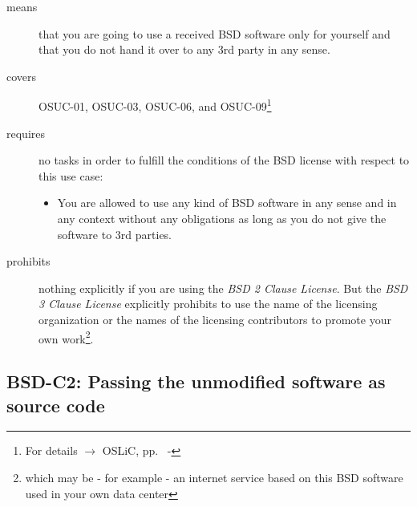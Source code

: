 \begin{description}
\item[means] that you are going to use a received BSD software only for yourself
and that you do not hand it over to any 3rd party in any sense.
\item[covers] OSUC-01, OSUC-03, OSUC-06, and OSUC-09\footnote{For details
$\rightarrow$ OSLiC, pp.\
  \pageref{OSUC-01-DEF} - \pageref{OSUC-09-DEF}}
\item[requires] no tasks in order to fulfill the conditions of the BSD license
with respect to this use case:
  \begin{itemize}
    \item You are allowed to use any kind of BSD software in any sense and in
    any context without any obligations as long as you do not give the software
    to 3rd parties.
  \end{itemize}
\item[prohibits] nothing explicitly if you are using the \emph{BSD 2 Clause
License}. But the \emph{BSD 3 Clause License} explicitly prohibits to use the
name of the licensing organization or the names of the licensing contributors to
promote your own work\footnote{which may be - for example - an internet service
based on this BSD software used in your own data center}.
\end{description}


\subsection{BSD-C2: Passing the unmodified software as source code}
\label{OSUC-02S-BSD} \label{OSUC-05S-BSD} \label{OSUC-07S-BSD} 

